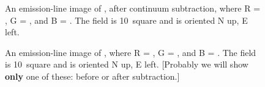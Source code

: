 \pagebreak





\clearpage




\startlongtable

\clearpage





\pagebreak



\clearpage

\startlongtable



\pagebreak
%

\begin{figure}
\caption{An emission-line image of \gal, after continuum subtraction, where R = \ha, G = \sii, and B = \oiii.  The field is 10\arcmin\ square and is oriented N up, E left. \label{fig_overview} }
\end{figure}

\begin{figure}
\caption{An emission-line image of \gal, where R = \ha, G = \sii, and B = \oiii.  The field is 10\arcmin\ square and is oriented N up, E left.  [Probably we will show {\bf only} one of these: before or after subtraction.] }
\end{figure}

